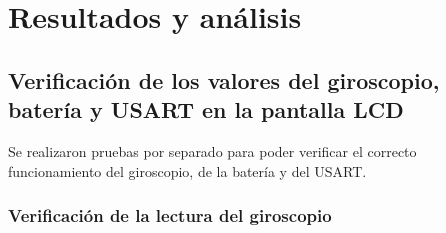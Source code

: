 \section{Resultados y análisis}


\subsection{Verificación de los valores del giroscopio, batería y USART en la pantalla LCD}

Se realizaron pruebas por separado para poder verificar el correcto funcionamiento del giroscopio, de la batería y del USART.

\subsubsection{Verificación de la lectura del giroscopio}


